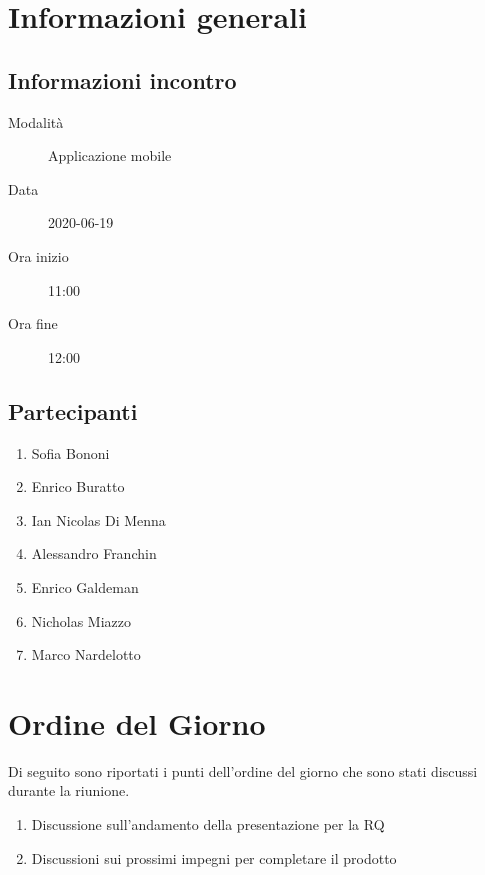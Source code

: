 \documentclass{article}
\begin{document}


\section{Informazioni generali}%
\label{sec:informazioni_generali}

\subsection{Informazioni incontro}%
\label{sub:informazioni_incontro}

\begin{description}
  \item[Modalità] Applicazione mobile 
  \item[Data] 2020-06-19
  \item[Ora inizio] 11:00
  \item[Ora fine] 12:00
\end{description}

\subsection{Partecipanti}%
\label{sub:partecipanti}

\begin{enumerate}
  \item Sofia Bononi
  \item Enrico Buratto
  \item Ian Nicolas Di Menna
  \item Alessandro Franchin
  \item Enrico Galdeman
  \item Nicholas Miazzo
  \item Marco Nardelotto
\end{enumerate}

\section{Ordine del Giorno}%
\label{ordine_del_giorno}
Di seguito sono riportati i punti dell'ordine del giorno che sono stati discussi durante la riunione.
\begin{enumerate}
  \item Discussione sull'andamento della presentazione per la RQ
  \item Discussioni sui prossimi impegni per completare il prodotto
\end{enumerate}
\end{document}

